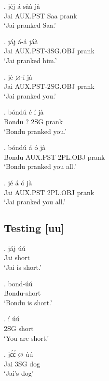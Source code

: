 \documentclass{assets/fieldnotes}
\begin{document}
\exg. jéj á sàà jà \\
Jai AUX.PST Saa prank \\
`Jai pranked Saa.'

\exg. jáj á-á jáà \\
Jai AUX.PST-3SG.OBJ prank \\
`Jai pranked him.'

\exg. jé $\varnothing$-í jà \\
Jai AUX.PST-2SG.OBJ prank \\
`Jai pranked you.'


\exg. bóndú é í jà \\
Bondu ? 2SG prank \\
`Bondu pranked you.'

\exg. bóndú á ó jà \\
Bondu AUX.PST 2PL.OBJ prank \\
`Bondu pranked you all.'


\exg. jé á ó jà \\
Jai AUX.PST 2PL.OBJ prank \\
`Jai pranked you all.'

\subsection{Testing [uu]}

\exg. jáj úú \\
Jai short \\
`Jai is short.'

\exg. bond-úú \\
Bondu-short \\
`Bondu is short.' \label{bondu_short}


\exg. í úú \\
2SG short \\
`You are short.'


\exg. jɛ́ɛ́ $\varnothing$ úú \\
Jai 3SG dog \\
`Jai's dog'

\end{document}
